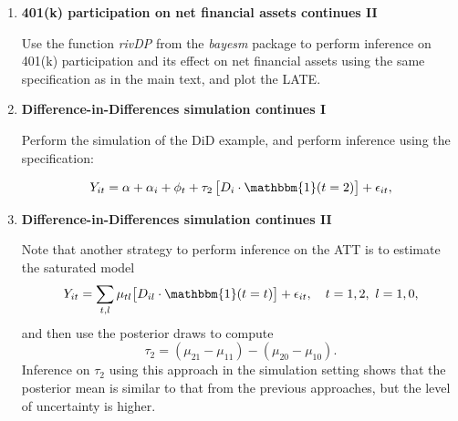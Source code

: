 \begin{enumerate}
	\item \textbf{401(k) participation on net financial assets continues II} 
	
	Use the function \textit{rivDP} from the \textit{bayesm} package to perform inference on 401(k) participation and its effect on net financial assets using the same specification as in the main text, and plot the LATE.
	
	\item \textbf{Difference-in-Differences simulation continues I}
	
	Perform the simulation of the DiD example, and perform inference using the specification:
	
	\[
	Y_{it} = \alpha + \alpha_i + \phi_t + \tau_2 \,\big[ D_i \cdot \mathbbm{1}(t = 2) \big] + \epsilon_{it},
	\]
	
	\item \textbf{Difference-in-Differences simulation continues II}
	
	Note that another strategy to perform inference on the ATT is to estimate the saturated model
	\[
	Y_{it} = \sum_{t,l} \mu_{tl} \big[ D_{il} \cdot \mathbbm{1}(t = t) \big] + \epsilon_{it}, \quad t = 1, 2, \ l = 1, 0,
	\]
	and then use the posterior draws to compute
	\[
	\tau_2 = (\mu_{21} - \mu_{11}) - (\mu_{20} - \mu_{10}).
	\]
	Inference on $\tau_2$ using this approach in the simulation setting shows that the posterior mean is similar to that from the previous approaches, but the level of uncertainty is higher.
	
	  
	 
	
	
\end{enumerate}
